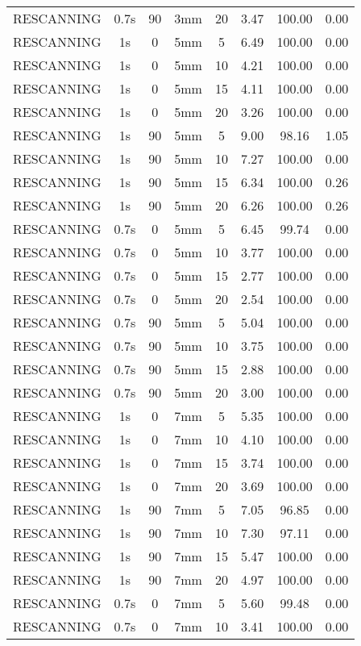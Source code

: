 \begin{table}[H]
\begin{tabular}{|c||c|c|c|c||c|c|c|}
RESCANNING & 0.7s & 90 & 3mm & 20 & 3.47 & 100.00 & 0.00 \\
RESCANNING & 1s & 0 & 5mm & 5 & 6.49 & 100.00 & 0.00 \\
RESCANNING & 1s & 0 & 5mm & 10 & 4.21 & 100.00 & 0.00 \\
RESCANNING & 1s & 0 & 5mm & 15 & 4.11 & 100.00 & 0.00 \\
RESCANNING & 1s & 0 & 5mm & 20 & 3.26 & 100.00 & 0.00 \\
RESCANNING & 1s & 90 & 5mm & 5 & 9.00 & 98.16 & 1.05 \\
RESCANNING & 1s & 90 & 5mm & 10 & 7.27 & 100.00 & 0.00 \\
RESCANNING & 1s & 90 & 5mm & 15 & 6.34 & 100.00 & 0.26 \\
RESCANNING & 1s & 90 & 5mm & 20 & 6.26 & 100.00 & 0.26 \\
RESCANNING & 0.7s & 0 & 5mm & 5 & 6.45 & 99.74 & 0.00 \\
RESCANNING & 0.7s & 0 & 5mm & 10 & 3.77 & 100.00 & 0.00 \\
RESCANNING & 0.7s & 0 & 5mm & 15 & 2.77 & 100.00 & 0.00 \\
RESCANNING & 0.7s & 0 & 5mm & 20 & 2.54 & 100.00 & 0.00 \\
RESCANNING & 0.7s & 90 & 5mm & 5 & 5.04 & 100.00 & 0.00 \\
RESCANNING & 0.7s & 90 & 5mm & 10 & 3.75 & 100.00 & 0.00 \\
RESCANNING & 0.7s & 90 & 5mm & 15 & 2.88 & 100.00 & 0.00 \\
RESCANNING & 0.7s & 90 & 5mm & 20 & 3.00 & 100.00 & 0.00 \\
RESCANNING & 1s & 0 & 7mm & 5 & 5.35 & 100.00 & 0.00 \\
RESCANNING & 1s & 0 & 7mm & 10 & 4.10 & 100.00 & 0.00 \\
RESCANNING & 1s & 0 & 7mm & 15 & 3.74 & 100.00 & 0.00 \\
RESCANNING & 1s & 0 & 7mm & 20 & 3.69 & 100.00 & 0.00 \\
RESCANNING & 1s & 90 & 7mm & 5 & 7.05 & 96.85 & 0.00 \\
RESCANNING & 1s & 90 & 7mm & 10 & 7.30 & 97.11 & 0.00 \\
RESCANNING & 1s & 90 & 7mm & 15 & 5.47 & 100.00 & 0.00 \\
RESCANNING & 1s & 90 & 7mm & 20 & 4.97 & 100.00 & 0.00 \\
RESCANNING & 0.7s & 0 & 7mm & 5 & 5.60 & 99.48 & 0.00 \\
RESCANNING & 0.7s & 0 & 7mm & 10 & 3.41 & 100.00 & 0.00 \\

\end{tabular}
\end{table}
